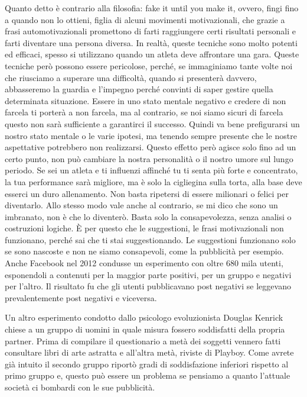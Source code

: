 \documentclass[12pt]{book} %
\begin{document}
Quanto detto è contrario alla filosofia: fake it until you make it, ovvero, fingi fino a quando non lo ottieni, figlia
di alcuni movimenti motivazionali, che grazie a frasi automotivazionali promettono di farti raggiungere certi risultati
personali e farti diventare una persona diversa. In realtà, queste tecniche sono molto potenti ed efficaci, spesso si
utilizzano quando un atleta deve affrontare una gara. Queste tecniche però possono essere pericolose, perché, se
immaginiamo tante volte noi che riusciamo a superare una difficoltà, quando si presenterà davvero, abbasseremo la
guardia e l'impegno perché convinti di saper gestire quella determinata situazione. Essere in uno
stato mentale negativo e credere di non farcela ti porterà a non farcela, ma al contrario, se noi siamo sicuri di
farcela questo non sarà sufficiente a garantirci il successo. Quindi va bene prefigurarsi un nostro stato mentale o le
varie ipotesi, ma tenendo sempre presente che le nostre aspettative potrebbero non realizzarsi. Questo effetto però
agisce solo fino ad un certo punto, non può cambiare la nostra personalità o il nostro umore sul lungo periodo. Se sei
un atleta e ti influenzi affinché tu ti senta più forte e concentrato, la tua performance sarà migliore, ma è solo la
cigliegina sulla torta, alla base deve esserci un duro allenamento. Non basta ripetersi di essere milionari o felici
per diventarlo. Allo stesso modo vale anche al contrario, se mi dico che sono un imbranato, non è che lo diventerò.
Basta solo la consapevolezza, senza analisi o costruzioni logiche. È per questo che le suggestioni, le frasi
motivazionali non funzionano, perché sai che ti stai suggestionando. Le suggestioni funzionano solo se sono nascoste e
non ne siamo consapevoli, come la pubblicità per esempio. Anche Facebook nel 2012 condusse un esperimento con oltre 680
mila utenti, esponendoli a contenuti per la maggior parte positivi, per un gruppo e negativi per
l'altro. Il risultato fu che gli utenti pubblicavano post negativi se leggevano prevalentemente
post negativi e viceversa.

Un altro esperimento condotto dallo psicologo evoluzionista Douglas Kenrick chiese a un gruppo di uomini in quale misura
fossero soddisfatti della propria partner. Prima di compilare il questionario a metà dei soggetti vennero fatti
consultare libri di arte astratta e all'altra metà, riviste di Playboy. Come avrete già intuito il
secondo gruppo riportò gradi di soddisfazione inferiori rispetto al primo gruppo e, questo può essere un problema se
pensiamo a quanto l'attuale società ci bombardi con le sue pubblicità.
\end{document}
